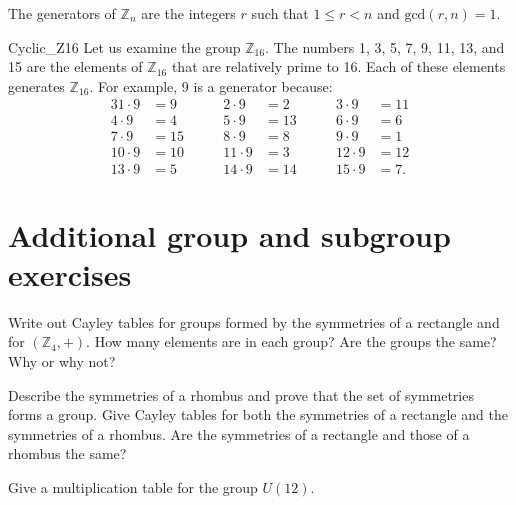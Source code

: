  
\begin{corollary}
The generators of ${\mathbb Z}_n$ are the integers $r$ such that $1 \leq
r < n$ and $\text{gcd}(r,n) =  1$. 
\end{corollary}
 
 
\begin{example}{Cyclic_Z16}
Let us examine the group ${\mathbb Z}_{16}$.  The numbers 1, 3, 5, 7, 9,
11, 13, and 15 are the elements of ${\mathbb Z}_{16}$ that are relatively
prime to 16.  Each of these elements generates ${\mathbb Z}_{16}$. For
example, 9 is a generator because:
\begin{alignat*}{3}
1 \cdot 9  & =  9  & \qquad 2 \cdot 9  & = 2  & \qquad 3 \cdot 9  & = 11 \\
4 \cdot 9  & =  4  & \qquad 5 \cdot 9  & = 13 & \qquad	6 \cdot 9 & = 6  \\
7 \cdot 9  & =  15 & \qquad 8 \cdot 9  & = 8  & \qquad	9 \cdot 9 &  = 1  \\
10 \cdot 9 & =  10 & \qquad 11 \cdot 9 & = 3  & \qquad	12 \cdot 9 &  = 12 \\
13 \cdot 9 & =  5 &  \qquad 14 \cdot 9 & = 14 &  \qquad	15 \cdot 9 & = 7.
\end{alignat*}
\end{example}



\section{Additional group and subgroup exercises}
\label{sec:Groups:AdditionalExercises}


\begin{exercise}{} 
Write out Cayley tables for groups formed by the symmetries of a
rectangle and for $({\mathbb Z}_4, +)$. How many elements are in each
group? Are the groups the same? Why or why not? 
\end{exercise} 
 
\begin{exercise}{} 
Describe the symmetries of a rhombus and prove that the set of
symmetries forms a group. Give Cayley tables for both the symmetries
of a rectangle and the symmetries of a rhombus. Are the symmetries of
a rectangle and those of a rhombus the same?
\end{exercise} 
 
\begin{exercise}{} 
Give a multiplication table for the group $U(12)$.
\end{exercise} 
 
